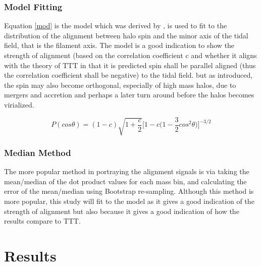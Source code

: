 \documentclass[a4paper,fleqn,usenatbib]{mnras}
\begin{document}
\subsubsection{Model Fitting} 

Equation \ref{mod} is the model which was derived by \citet{Lee_11}, is used to fit to the distribution of the alignment between halo spin and the minor axis of the tidal field, that is the filament axis. The model is a good indication to show the strength of alignment (based on the correlation coefficient c and whether it aligns with the theory of TTT in that it is predicted spin shall be parallel aligned (thus the correlation coefficient shall be negative) to the tidal field. but as introduced, the spin may also become orthogonal, especially of high mass halos, due to mergers and accretion and perhaps a later turn around before the halos becomes virialized.
\begin{ceqn}
\begin{equation}
\textit{P}(cos\theta)=(1-c)\sqrt{1+\frac{c}{2}}\Big[1-c\Big(1-\frac{3}{2}cos^{2}\theta\Big)\Big]^{-3/2} \label{mod}
\end{equation}
\end{ceqn}

\subsubsection{Median Method}
The more popular method in portraying the alignment signals is via taking the mean/median of the dot product values for each mass bin, and calculating the error of the mean/median using Bootstrap re-sampling. Although this method is more popular, this study will fit to the model as it gives a good indication of the strength of alignment but also because it gives a good indication of how the results compare to TTT.

\section{Results}\label{results}
 
\end{document}
